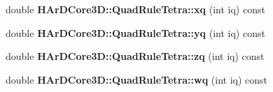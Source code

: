 \begin{DoxyCompactItemize}
double {\bfseries H\+Ar\+D\+Core3\+D\+::\+Quad\+Rule\+Tetra\+::xq} (int iq) const
\item 
\mbox{\label{group__Quadratures_ga0dffade47ba012f57c7ca552570e2119}} 
double {\bfseries H\+Ar\+D\+Core3\+D\+::\+Quad\+Rule\+Tetra\+::yq} (int iq) const
\item 
\mbox{\label{group__Quadratures_ga4693da35cc21331c2737c08b8166c54c}} 
double {\bfseries H\+Ar\+D\+Core3\+D\+::\+Quad\+Rule\+Tetra\+::zq} (int iq) const
\item 
\mbox{\label{group__Quadratures_gae38100dd53fe45b8a3d263458b0ffc95}} 
double {\bfseries H\+Ar\+D\+Core3\+D\+::\+Quad\+Rule\+Tetra\+::wq} (int iq) const
\end{DoxyCompactItemize}
